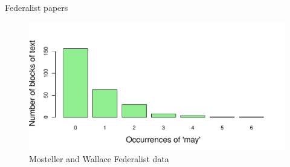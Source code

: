 \documentclass[10pt,krantz2]{krantz}\usepackage[]{graphicx}\usepackage[]{color}
\newenvironment{knitrout}{}{} %
\renewenvironment{knitrout}{\small\renewcommand{\baselinestretch}{.85}}{} %
\begin{document}
\begin{Example}[madison1]{Federalist papers}
\begin{knitrout}
\begin{figure}[!htbp]
\centerline{\includegraphics[width=.75\textwidth]{ch03/fig/federalist-1} }

\caption[Mosteller and Wallace Federalist data]{Mosteller and Wallace Federalist data\label{fig:federalist}}
\end{figure}


\end{knitrout}
\end{Example}
\end{document}
